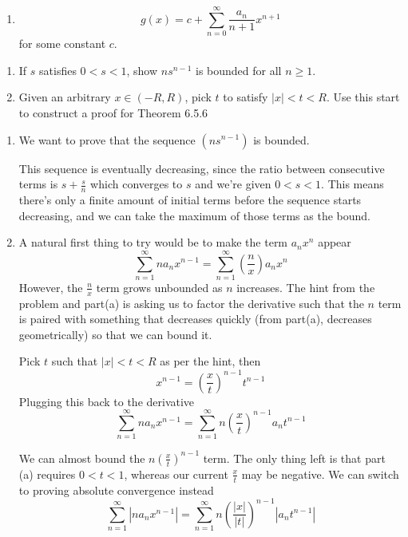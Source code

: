 \documentclass{oxmathproblems}
\begin{document}
\begin{questions}
\begin{solution}
\begin{enumerate}[label=(\alph*)]
    \item \[g(x) = c + \sum_{n=0}^{\infty} \frac{a_{n}}{n+1}x^{n+1}\]
    for some constant $c$.
  \end{enumerate}
\end{solution}

\miquestion
\begin{enumerate}[label=(\alph*)]
  \item If $s$ satisfies $0 < s < 1$, show $ns^{n-1}$ is bounded for all $n \geq 1$.
  \item Given an arbitrary $x \in (-R, R)$, pick $t$ to satisfy $|x| < t < R$. Use this start to construct a proof for Theorem 6.5.6
\end{enumerate}

\begin{solution}
  \begin{enumerate}
    \item We want to prove that the sequence $(ns^{n-1})$ is bounded.
    
    This sequence is eventually decreasing, since the ratio between consecutive
    terms is $s + \frac{s}{n}$ which converges to $s$ and we're given $0 < s < 1$. This means there's only a finite amount of initial terms before
    the sequence starts decreasing, and we can take the maximum of those terms as the bound.
  
    \item A natural first thing to try would be to make the term $a_{n}x^{n}$ appear
    \[\sum_{n=1}^{\infty} na_{n}x^{n-1} = \sum_{n=1}^{\infty} (\frac{n}{x}) a_{n}x^{n}\]
    However, the $\frac{n}{x}$ term grows unbounded as $n$ increases. The hint from the problem and part(a) is asking us to factor the derivative
    such that the $n$ term is paired with something that decreases quickly (from part(a), decreases geometrically) so that we can bound it.

    Pick $t$ such that $|x| < t < R$ as per the hint, then
    \[x^{n-1} = \left(\frac{x}{t}\right)^{n-1} t^{n-1} \]
    Plugging this back to the derivative
    \[\sum_{n=1}^{\infty} na_{n}x^{n-1} = \sum_{n=1}^{\infty} n\left(\frac{x}{t}\right)^{n-1} a_{n}t^{n-1}\]

    We can almost bound the $n\left(\frac{x}{t}\right)^{n-1}$ term. The only thing left is that part (a) requires $0 < t < 1$, whereas our current $\frac{x}{t}$
    may be negative. We can switch to proving absolute convergence instead
    \[\sum_{n=1}^{\infty} |na_{n}x^{n-1}| =  \sum_{n=1}^{\infty} n\left(\frac{|x|}{|t|}\right)^{n-1} |a_{n}t^{n-1}|\]
    

\end{enumerate}
\end{solution}
\end{questions}
\end{document}
